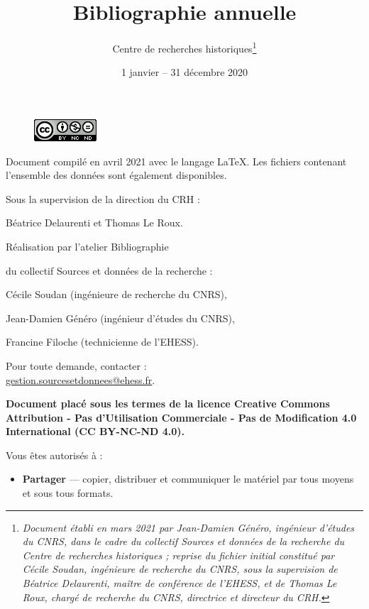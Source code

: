\documentclass{article}
\title{\textbf{Bibliographie annuelle}}
\author{Centre de recherches historiques\footnote{\textit{Document établi en mars 2021 par Jean-Damien Généro, ingénieur d'études du CNRS, dans le cadre du collectif Sources et données de la recherche du Centre de recherches historiques ; reprise du fichier initial constitué par Cécile Soudan, ingénieure de recherche du CNRS, sous la supervision de Béatrice Delaurenti, maître de conférence de l'EHESS, et de 
Thomas Le Roux, chargé de recherche du CNRS, directrice et directeur du CRH.}}}
\date{1\up{er} janvier -- 31 décembre 2020}
\begin{document}
\renewcommand{\contentsname}{Sommaire}


\newpage
\thispagestyle{empty}

\begin{figure}
    \centering
    \includegraphics{img/licence-cc-icon.png}
    \label{fig:licence}
\end{figure}

\bigskip

\bigskip
\begin{center}
\begin{itshape}

Document compilé en avril 2021 avec le langage \LaTeX. Les fichiers  contenant l'ensemble des données sont également disponibles.

\medskip

Sous la supervision de la direction du CRH :

Béatrice Delaurenti et Thomas Le Roux.

\medskip

Réalisation par l'atelier \og Bibliographie \fg

du collectif \og Sources et données de la recherche \fg :

Cécile Soudan (ingénieure de recherche du CNRS),

Jean-Damien Généro (ingénieur d’études du CNRS),

Francine Filoche (technicienne de l’EHESS).

\medskip

Pour toute demande, contacter :\\\url{gestion.sourcesetdonnees@ehess.fr}.

\end{itshape}

\bigskip

\bigskip

    \textbf{Document placé sous les termes de la licence Creative Commons Attribution - Pas d'Utilisation Commerciale - Pas de Modification 4.0 International (CC BY-NC-ND 4.0).}
\end{center}

\bigskip

    Vous êtes autorisés à :
    \begin{itemize}
        \item \textbf{Partager} --- copier, distribuer et communiquer le matériel par tous moyens et sous tous formats.
    \end{itemize}
\end{document}
